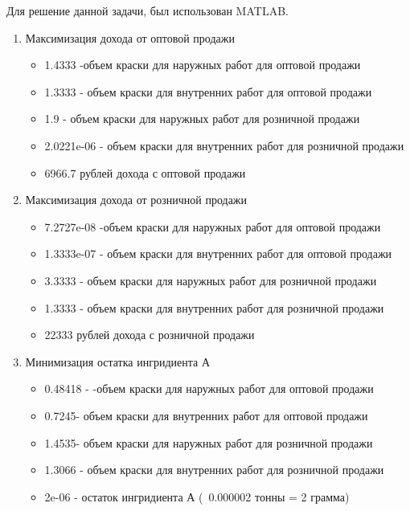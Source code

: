 \documentclass[14pt,a4paper,report]{report}
\begin{document}
Для решение данной задачи, был использован MATLAB.





\begin{enumerate}
    \item Максимизация дохода от оптовой продажи
    \begin{itemize}
        \item 1.4333 -объем краски  для наружных работ для оптовой продажи 
        \item 1.3333 - объем краски  для внутренних работ для оптовой продажи 
        \item 1.9 -  объем краски для наружных работ для розничной продажи
        \item 2.0221e-06 - объем краски  для внутренних работ для розничной продажи
        \item 6966.7 рублей дохода с оптовой продажи
    \end{itemize}
        \item Максимизация дохода от розничной продажи
            \begin{itemize}
        \item 7.2727e-08 -объем краски  для наружных работ для оптовой продажи 
        \item 1.3333e-07 - объем краски  для внутренних работ для оптовой продажи 
        \item 3.3333 -  объем краски для наружных работ для розничной продажи
        \item  1.3333 - объем краски  для внутренних работ для розничной продажи
        \item 22333 рублей дохода с розничной продажи
    \end{itemize}
    \item Минимизация остатка ингридиента А
    \begin{itemize}
        \item    0.48418 - -объем краски  для наружных работ для оптовой продажи 
        \item    0.7245- объем краски  для внутренних работ для оптовой продажи 
        \item 1.4535-  объем краски для наружных работ для розничной продажи
        \item   1.3066 - объем краски  для внутренних работ для розничной продажи
        \item 2e-06 - остаток ингридиента А (~0.000002 тонны = 2 грамма)
    \end{itemize}


\end{enumerate}
\end{document}
